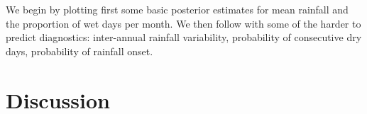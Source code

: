 \documentclass[12pt]{article}
\begin{document}
We begin by plotting first some basic posterior estimates for mean rainfall and the proportion of wet days per month. We then follow with some of the harder to predict diagnostics: inter-annual rainfall variability, probability of consecutive dry days, probability of rainfall onset.










\section{Discussion}
\label{sec:discussion}
\end{document}
